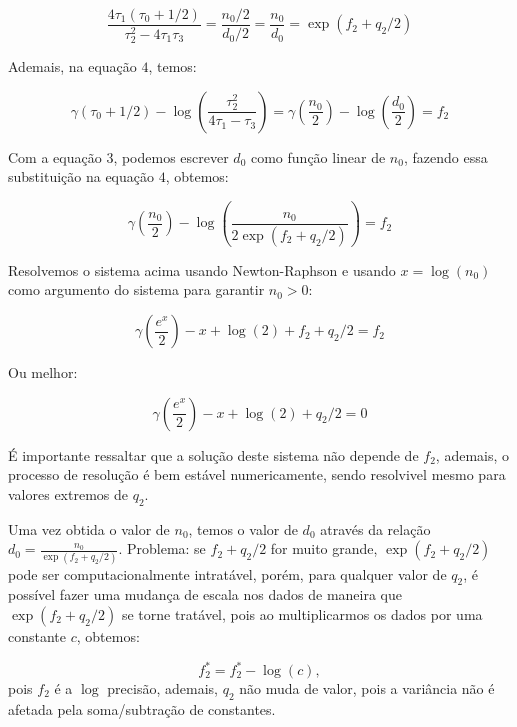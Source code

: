 \documentclass[
]{article}
\begin{document}
\[
\frac{4\tau_1(\tau_0+1/2)}{\tau_2^2-4\tau_1\tau_3} = \frac{n_0/2}{d_0/2}= \frac{n_0}{d_0} = \exp(f_2+q_2/2)
\]

Ademais, na equação \(4\), temos:

\[
\gamma(\tau_0+1/2)-\log\left(\frac{\tau_2^2}{4\tau_1-\tau_3}\right) = \gamma\left(\frac{n_0}{2}\right)-\log\left(\frac{d_0}{2}\right)= f_2
\]

Com a equação \(3\), podemos escrever \(d_0\) como função linear de
\(n_0\), fazendo essa substituição na equação \(4\), obtemos:

\[
 \gamma\left(\frac{n_0}{2}\right)-\log\left(\frac{n_0}{2\exp(f_2+q_2/2)}\right)= f_2
\]

Resolvemos o sistema acima usando Newton-Raphson e usando
\(x=\log(n_0)\) como argumento do sistema para garantir \(n_0>0\):

\[
 \gamma\left(\frac{e^x}{2}\right)-x+\log(2)+f_2+q_2/2= f_2
\]

Ou melhor:

\[
 \gamma\left(\frac{e^x}{2}\right)-x+\log(2)+q_2/2=0
\]

É importante ressaltar que a solução deste sistema não depende de
\(f_2\), ademais, o processo de resolução é bem estável numericamente,
sendo resolvivel mesmo para valores extremos de \(q_2\).

Uma vez obtida o valor de \(n_0\), temos o valor de \(d_0\) através da
relação \(d_0=\frac{n_0}{\exp(f_2+q_2/2)}\). Problema: se \(f_2+q_2/2\)
for muito grande, \(\exp(f_2+q_2/2)\) pode ser computacionalmente
intratável, porém, para qualquer valor de \(q_2\), é possível fazer uma
mudança de escala nos dados de maneira que \(\exp(f_2+q_2/2)\) se torne
tratável, pois ao multiplicarmos os dados por uma constante \(c\),
obtemos:

\[
f^*_2=f^*_2-\log(c),
\] pois \(f_2\) é a \(\log\) precisão, ademais, \(q_2\) não muda de
valor, pois a variância não é afetada pela soma/subtração de constantes.
\end{document}
